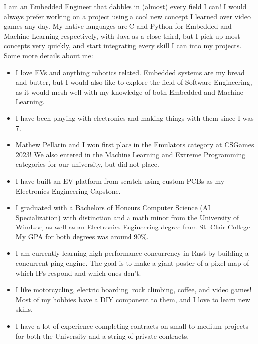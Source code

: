 I am an Embedded Engineer that dabbles in (almost) every field I can! I would always prefer working on a project using a cool new concept I learned over video games any day. My native languages are C and Python for Embedded and Machine Learning respectively, with Java as a close third, but I pick up most concepts very quickly, and start integrating every skill I can into my projects. Some more details about me:

\begin{itemize}
  \item I love EVs and anything robotics related. Embedded systems are my bread and butter, but I would also like to explore the field of Software Engineering, as it would mesh well with my knowledge of both Embedded and Machine Learning.
  \item I have been playing with electronics and making things with them since I was 7.
  \item Mathew Pellarin and I won first place in the Emulators category at CSGames 2023! We also entered in the Machine Learning and Extreme Programming categories for our university, but did not place.
  \item I have built an EV platform from scratch using custom PCBs as my Electronics Engineering Capstone.
  \item I graduated with a Bachelors of Honours Computer Science (AI Specialization) with distinction and a math minor from the University of Windsor, as well as an Electronics Engineering degree from St. Clair College. My GPA for both degrees was around 90\%.
  \item I am currently learning high performance concurrency in Rust by building a concurrent ping engine. The goal is to make a giant poster of a pixel map of which IPs respond and which ones don't.
  \item I like motorcycling, electric boarding, rock climbing, coffee, and video games! Most of my hobbies have a DIY component to them, and I love to learn new skills.
  \item I have a lot of experience completing contracts on small to medium projects for both the University and a string of private contracts.
\end{itemize}
